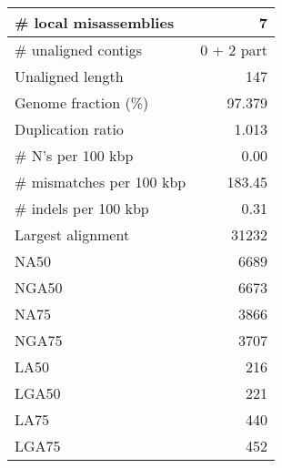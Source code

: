 \documentclass[12pt,a4paper]{article}
\begin{document}
\begin{table}[ht]
\begin{center}
\begin{tabular}{|l*{1}{|r}|}
\# local misassemblies & 7 \\ \hline
\# unaligned contigs & 0 + 2 part \\ \hline
Unaligned length & 147 \\ \hline
Genome fraction (\%) & 97.379 \\ \hline
Duplication ratio & 1.013 \\ \hline
\# N's per 100 kbp & 0.00 \\ \hline
\# mismatches per 100 kbp & 183.45 \\ \hline
\# indels per 100 kbp & 0.31 \\ \hline
Largest alignment & 31232 \\ \hline
NA50 & 6689 \\ \hline
NGA50 & 6673 \\ \hline
NA75 & 3866 \\ \hline
NGA75 & 3707 \\ \hline
LA50 & 216 \\ \hline
LGA50 & 221 \\ \hline
LA75 & 440 \\ \hline
LGA75 & 452 \\ \hline
\end{tabular}
\end{center}
\end{table}
\end{document}
